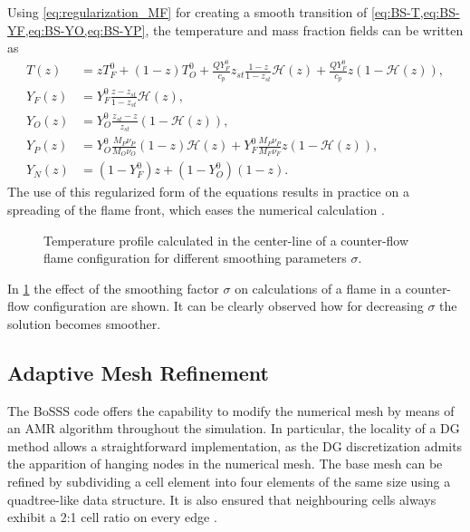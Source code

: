 Using \cref{eq:regularization_MF} for creating a smooth transition of \cref{eq:BS-T,eq:BS-YF,eq:BS-YO,eq:BS-YP}, the temperature and mass fraction fields can be written as
\begin{subequations}
	\begin{align}
		T(z)   & = z T_F^0 + (1-z)T_O^0 + \frac{Q Y_F^0}{c_p} z_{st}\frac{1- z}{1-z_{st}}\mathcal{H}(z) +  \frac{Q Y_F^0}{c_p}z\left(1-\mathcal{H}(z)\right),  \label{eq:BS-TR} \\[1ex]
		Y_F(z) & = Y_F^0\frac{z - z_{st}}{1-z_{st}} \mathcal{H}(z), \label{eq:BS-YFR}                                                                                           \\[1ex]
		Y_O(z) & = Y_O^0 \frac{z_{st}-z}{z_{st}} (1-\mathcal{H}(z)), \label{eq:BS-YOR}                                                                                          \\[1ex]
		Y_P(z) & =  Y_O^0\frac{M_P\nu_P}{M_O\nu_O}(1-z)\mathcal{H}(z) +	Y_F^0\frac{M_P\nu_P}{M_F\nu_F}z (1-\mathcal{H}(z)), \label{eq:BS-YPR}                                   \\[1ex]
		Y_N(z) & = (1-Y_F^0)z + (1-Y_O^0)(1-z). \label{eq:BS-YNR}
	\end{align}
\end{subequations}
The use of this regularized form of the equations results in practice on a spreading of the flame front, which eases the numerical calculation \parencite{braackAdaptiveFiniteElement1997}.
\begin{figure}[t]
	\centering
	\caption{Temperature profile calculated in the center-line of a counter-flow flame configuration for different smoothing parameters $\sigma$.}
	\label{fig:smoothings}
\end{figure}
In \cref{fig:smoothings} the effect of the smoothing factor $\sigma$ on calculations of a flame in a counter-flow configuration are shown. It can be clearly observed how for decreasing $\sigma$ the solution becomes smoother.


\subsection{Adaptive Mesh Refinement}\label{ssec:MeshRefinement}
The BoSSS code offers the capability to modify the numerical mesh by means of an \gls{AMR}  algorithm throughout the simulation. In particular, the locality of a DG method allows a straightforward implementation, as the DG discretization admits the apparition of hanging nodes in the numerical mesh. The base mesh can be refined by subdividing a cell element into four elements of the same size using a quadtree-like data structure. It is also ensured that neighbouring cells always exhibit a 2:1 cell ratio on every edge \parencite{smudamartinDirectNumericalSimulation2021}. 

